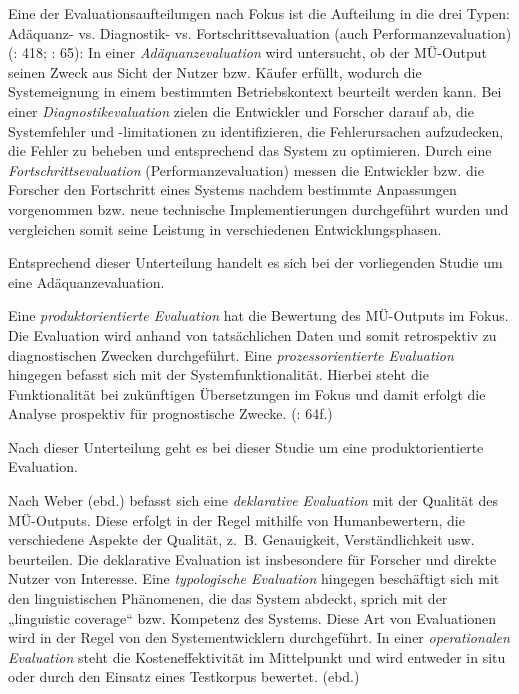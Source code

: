 Eine der Evaluationsaufteilungen nach Fokus ist die Aufteilung in die drei Typen: Adäquanz- vs. Diagnostik- vs. Fortschrittsevaluation (auch Performanzevaluation) (\citealt{Hutchins1997}: 418; \citealt{Weber1998}: 65): In einer \textit{Adäquanzevaluation} wird untersucht, ob der MÜ-Output seinen Zweck aus Sicht der Nutzer bzw. Käufer erfüllt, wodurch die Systemeignung in einem bestimmten Betriebskontext beurteilt werden kann. Bei einer \textit{Diagnostikevaluation} zielen die Entwickler und Forscher darauf ab, die Systemfehler und -limitationen zu identifizieren, die Fehlerursachen aufzudecken, die Fehler zu beheben und entsprechend das System zu optimieren. Durch eine \textit{Fortschrittsevaluation} (Performanzevaluation) messen die Entwickler bzw. die Forscher den Fortschritt eines Systems nachdem bestimmte Anpassungen vorgenommen bzw. neue technische Implementierungen durchgeführt wurden und vergleichen somit seine Leistung in verschiedenen Entwicklungsphasen. \citep[418]{Hutchins1997}

Entsprechend dieser Unterteilung handelt es sich bei der vorliegenden Studie um eine Adäquanzevaluation.


Eine \textit{produktorientierte Evaluation} hat die Bewertung des MÜ-Outputs im Fokus. Die Evaluation wird anhand von tatsächlichen Daten und somit retrospektiv zu diagnostischen Zwecken durchgeführt. Eine \textit{prozessorientierte Evaluation} hingegen befasst sich mit der Systemfunktionalität. Hierbei steht die Funktionalität bei zukünftigen Übersetzungen im Fokus und damit erfolgt die Analyse prospektiv für prognostische Zwecke. (\citealt{Weber1998}: 64f.)

Nach dieser Unterteilung geht es bei dieser Studie um eine produktorientierte Evaluation.


Nach Weber (ebd.) befasst sich eine \textit{deklarative Evaluation} mit der Qualität des MÜ-Outputs. Diese erfolgt in der Regel mithilfe von Humanbewertern, die verschiedene Aspekte der Qualität, z.~B. Genauigkeit, Verständlichkeit usw. beurteilen. Die deklarative Evaluation ist insbesondere für Forscher und direkte Nutzer von Interesse. Eine \textit{typologische Evaluation} hingegen beschäftigt sich mit den linguistischen Phänomenen, die das System abdeckt, sprich mit der „linguistic coverage“ bzw. Kompetenz des Systems. Diese Art von Evaluationen wird in der Regel von den Systementwicklern durchgeführt. In einer \textit{operationalen Evaluation} steht die Kosteneffektivität im Mittelpunkt und wird entweder in situ oder durch den Einsatz eines Testkorpus bewertet. (ebd.)

